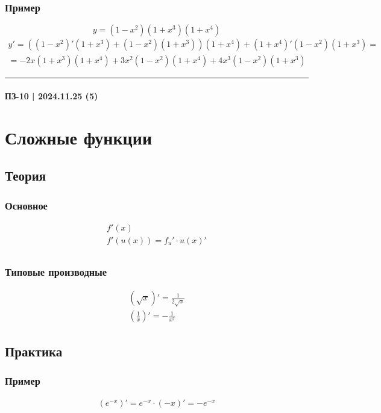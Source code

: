 \documentclass{article}
\begin{document}
\subsubsection{Пример}
\[
    y = (1 - x^2)(1 + x^3)(1 + x^4)
\]
\begin{gather*}
    y' = \left((1 - x^2)'(1 + x^3) + (1 - x^2)(1 + x^3) \right)(1 + x^4) + (1 + x^4)'(1 - x^2)(1 + x^3) = \\
    = -2x (1 + x^3)(1 + x^4) + 3x^2 (1 - x^2)(1 + x^4) + 4x^3 (1 - x^2)(1 + x^3) 
\end{gather*}



\par\noindent\rule{\textwidth}{1pt}
\paragraph{ПЗ-10 | 2024.11.25 (5)}
\section{Сложные функции}

\subsection{Теория}

\subsubsection{Основное}
\begin{gather*}
    f'(x) \\
    f'(u(x)) = f_u' \cdot u(x)' \\ 
\end{gather*}

\subsubsection{Типовые производные}
\begin{gather*}
    (\sqrt{x})' = \frac{1}{2\sqrt{x}} \\
    \left( \frac{1}{x} \right)' = -\frac{1}{x^2}
\end{gather*}


\subsection{Практика}

\subsubsection{Пример}
\begin{gather*}
    (e^{-x})' = e^{-x} \cdot (-x)' = -e^{-x}
\end{gather*}
\end{document}
